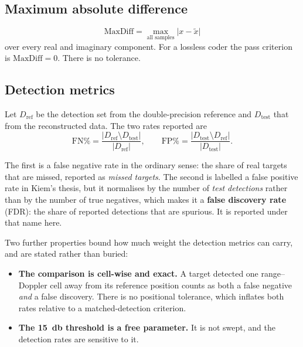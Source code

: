 \subsection{Maximum absolute difference}
\begin{equation}
\mathrm{MaxDiff} = \max_{\text{all samples}}
   \bigl| x - \tilde{x} \bigr|
\end{equation}
over every real and imaginary component. For a lossless coder the pass
criterion is $\mathrm{MaxDiff} = 0$. There is no tolerance.

\subsection{Detection metrics}
\label{sec:detectionmetrics}

Let $D_{\mathrm{ref}}$ be the detection set from the double-precision reference
and $D_{\mathrm{test}}$ that from the reconstructed data. The two rates reported
are
\begin{equation}
\mathrm{FN}\% = \frac{|D_{\mathrm{ref}} \setminus D_{\mathrm{test}}|}{|D_{\mathrm{ref}}|},
\qquad
\mathrm{FP}\% = \frac{|D_{\mathrm{test}} \setminus D_{\mathrm{ref}}|}{|D_{\mathrm{test}}|}.
\end{equation}

The first is a false negative rate in the ordinary sense: the share of real
targets that are missed, reported as \emph{missed targets}. The second is
labelled a false positive rate in Kiem's thesis, but it normalises by the
number of \emph{test detections} rather than by the number of true negatives,
which makes it a \textbf{false discovery rate} (FDR): the share of reported
detections that are spurious. It is reported under that name here.

Two further properties bound how much weight the detection metrics can carry,
and are stated rather than buried:

\begin{itemize}
\item \textbf{The comparison is cell-wise and exact.} A target detected one
range--Doppler cell away from its reference position counts as both a false
negative \emph{and} a false discovery. There is no positional tolerance, which
inflates both rates relative to a matched-detection criterion.
\item \textbf{The \SI{15}{\decibel} threshold is a free parameter.} It is not
swept, and the detection rates are sensitive to it.
\end{itemize}


